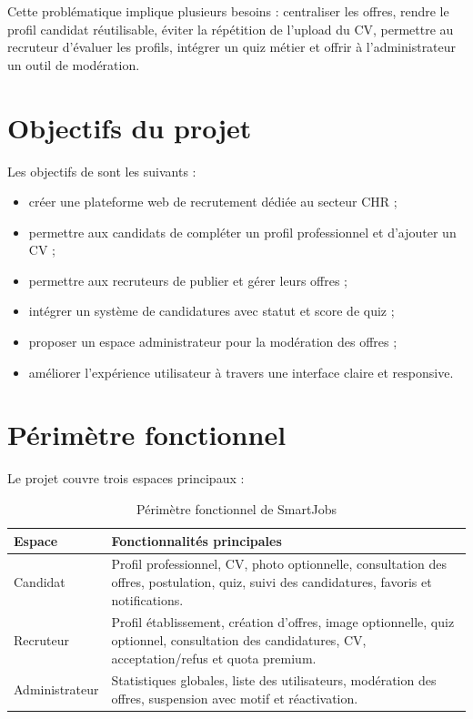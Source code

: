 \noindent
Cette problématique implique plusieurs besoins : centraliser les offres, rendre le profil candidat réutilisable, éviter la répétition de l'upload du CV, permettre au recruteur d'évaluer les profils, intégrer un quiz métier et offrir à l'administrateur un outil de modération.

\section{Objectifs du projet}

\noindent
Les objectifs de \projectName{} sont les suivants :

\begin{itemize}
    \item créer une plateforme web de recrutement dédiée au secteur CHR ;
    \item permettre aux candidats de compléter un profil professionnel et d'ajouter un CV ;
    \item permettre aux recruteurs de publier et gérer leurs offres ;
    \item intégrer un système de candidatures avec statut et score de quiz ;
    \item proposer un espace administrateur pour la modération des offres ;
    \item améliorer l'expérience utilisateur à travers une interface claire et responsive.
\end{itemize}

\section{Périmètre fonctionnel}

\noindent
Le projet couvre trois espaces principaux :

\begin{table}[h!]
\centering
\renewcommand{\arraystretch}{1.4}
\begin{tabular}{|p{3cm}|p{10cm}|}
\hline
\textbf{Espace} & \textbf{Fonctionnalités principales} \\
\hline
Candidat & Profil professionnel, CV, photo optionnelle, consultation des offres, postulation, quiz, suivi des candidatures, favoris et notifications. \\
\hline
Recruteur & Profil établissement, création d'offres, image optionnelle, quiz optionnel, consultation des candidatures, CV, acceptation/refus et quota premium. \\
\hline
Administrateur & Statistiques globales, liste des utilisateurs, modération des offres, suspension avec motif et réactivation. \\
\hline
\end{tabular}
\caption{Périmètre fonctionnel de SmartJobs}
\label{tab:perimetre_fonctionnel}
\end{table}

